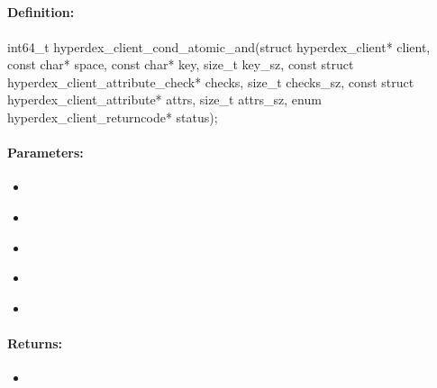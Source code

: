 \pagebreak
\subsection{}
\label{api:c:cond_atomic_and}


\paragraph{Definition:}
\begin{ccode}
int64_t hyperdex_client_cond_atomic_and(struct hyperdex_client* client,
        const char* space,
        const char* key, size_t key_sz,
        const struct hyperdex_client_attribute_check* checks, size_t checks_sz,
        const struct hyperdex_client_attribute* attrs, size_t attrs_sz,
        enum hyperdex_client_returncode* status);
\end{ccode}

\paragraph{Parameters:}
\begin{itemize}[noitemsep]
\item {}\\

\item {}\\

\item {}\\

\item {}\\

\item {}\\

\end{itemize}

\paragraph{Returns:}
\begin{itemize}[noitemsep]
\item {}\\

\end{itemize}

